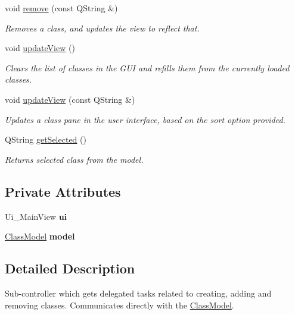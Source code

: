 \begin{DoxyCompactItemize}
void \hyperlink{classClassController_ac8d209c4e52899c11020f6a3b35f6416}{remove} (const Q\+String \&)
\begin{DoxyCompactList}\small\item\em Removes a class, and updates the view to reflect that. \end{DoxyCompactList}\item 
\mbox{\label{classClassController_a1a286317364cc2fddb8c5c2419f38134}} 
void \hyperlink{classClassController_a1a286317364cc2fddb8c5c2419f38134}{update\+View} ()
\begin{DoxyCompactList}\small\item\em Clears the list of classes in the G\+UI and refills them from the currently loaded classes. \end{DoxyCompactList}\item 
void \hyperlink{classClassController_a7296a8879b4aa942920d1fa77a146d5b}{update\+View} (const Q\+String \&)
\begin{DoxyCompactList}\small\item\em Updates a class pane in the user interface, based on the sort option provided. \end{DoxyCompactList}\item 
Q\+String \hyperlink{classClassController_a9132aaebc5cbc174e6fc3c3a1d46c695}{get\+Selected} ()
\begin{DoxyCompactList}\small\item\em Returns selected class from the model. \end{DoxyCompactList}\end{DoxyCompactItemize}
\subsection*{Private Attributes}
\begin{DoxyCompactItemize}
\item 
\mbox{\label{classClassController_a4c59d251037fb7c71597210e655a9f10}} 
Ui\+\_\+\+Main\+View {\bfseries ui}
\item 
\mbox{\label{classClassController_ab14c00b28d3a7a7d6178deaa3a2aa88d}} 
\hyperlink{classClassModel}{Class\+Model} {\bfseries model}
\end{DoxyCompactItemize}


\subsection{Detailed Description}
Sub-\/controller which gets delegated tasks related to creating, adding and removing classes. Communicates directly with the \hyperlink{classClassModel}{Class\+Model}. 

